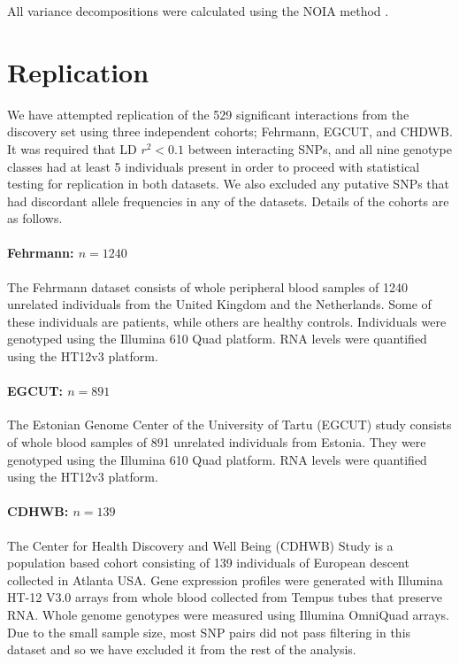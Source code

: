 \documentclass{article}
\begin{document}
All variance decompositions were calculated using the NOIA method \cite{Alvarez-Castro2008}.


\section{Replication}
We have attempted replication of the 529 significant interactions from the discovery set using three independent cohorts; Fehrmann, EGCUT, and CHDWB. It was required that LD $r^2 < 0.1$ between interacting SNPs, and all nine genotype classes had at least 5 individuals present in order to proceed with statistical testing for replication in both datasets. We also excluded any putative SNPs that had discordant allele frequencies in any of the datasets. Details of the cohorts are as follows.

\paragraph{Fehrmann: $n=1240$}
The Fehrmann dataset \cite{Fehrmann2011} consists of whole peripheral blood samples of 1240 unrelated individuals from the United Kingdom and the Netherlands. Some of these individuals are patients, while others are healthy controls. Individuals were genotyped using the Illumina 610 Quad platform. RNA levels were quantified using the HT12v3 platform.

\paragraph{EGCUT: $n=891$}
The Estonian Genome Center of the University of Tartu (EGCUT) study \cite{Metspalu2004} consists of whole blood samples of 891 unrelated individuals from Estonia. They were genotyped using the Illumina 610 Quad platform. RNA levels were quantified using the HT12v3 platform.

\paragraph{CDHWB: $n=139$}
The Center for Health Discovery and Well Being (CDHWB) Study \cite{Preininger2013} is a population based cohort consisting of 139 individuals of European descent collected in Atlanta USA. Gene expression profiles were generated with Illumina HT-12 V3.0 arrays from whole blood collected from Tempus tubes that preserve RNA. Whole genome genotypes were measured using Illumina OmniQuad arrays. Due to the small sample size, most SNP pairs did not pass filtering in this dataset and so we have excluded it from the rest of the analysis.
\end{document}
